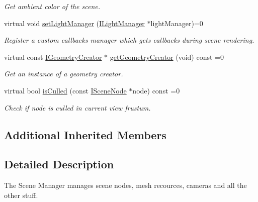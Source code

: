\begin{DoxyCompactItemize}
\begin{DoxyCompactList}\small\item\em Get ambient color of the scene. \end{DoxyCompactList}\item 
virtual void \hyperlink{classirr_1_1scene_1_1ISceneManager_a0065307bf3ff12fdc5b7bb624987a1c2}{set\+Light\+Manager} (\hyperlink{classirr_1_1scene_1_1ILightManager}{I\+Light\+Manager} $\ast$light\+Manager)=0
\begin{DoxyCompactList}\small\item\em Register a custom callbacks manager which gets callbacks during scene rendering. \end{DoxyCompactList}\item 
virtual const \hyperlink{classirr_1_1scene_1_1IGeometryCreator}{I\+Geometry\+Creator} $\ast$ \hyperlink{classirr_1_1scene_1_1ISceneManager_a9840cfd39b44f238d06b7bc51e6ba1f6}{get\+Geometry\+Creator} (void) const =0
\begin{DoxyCompactList}\small\item\em Get an instance of a geometry creator. \end{DoxyCompactList}\item 
virtual bool \hyperlink{classirr_1_1scene_1_1ISceneManager_aff6c6d553e0faf12bbfd33e814ad4352}{is\+Culled} (const \hyperlink{classirr_1_1scene_1_1ISceneNode}{I\+Scene\+Node} $\ast$node) const =0
\begin{DoxyCompactList}\small\item\em Check if node is culled in current view frustum. \end{DoxyCompactList}\end{DoxyCompactItemize}
\subsection*{Additional Inherited Members}


\subsection{Detailed Description}
The Scene Manager manages scene nodes, mesh recources, cameras and all the other stuff. 

